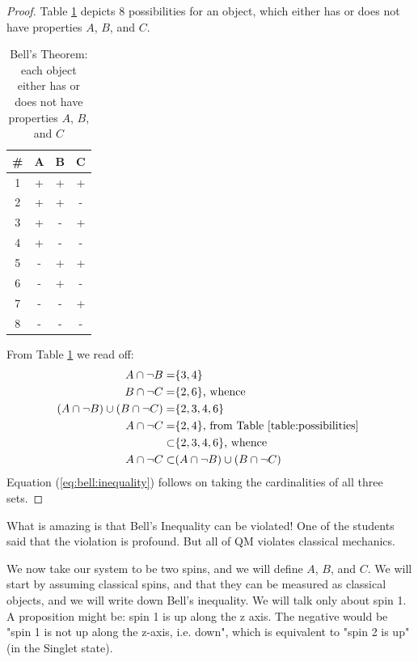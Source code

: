 \documentclass[]{article}
\begin{document}
\begin{proof}

    Table \ref{table:possibilities} depicts 8 possibilities for an object, which either has or does not have properties $A$, $B$, and $C$.
  
	\begin{table}[H]
		\caption{Bell's Theorem: each object either has or does not have properties $A$, $B$, and $C$}\label{table:possibilities}
		\begin{center}
			\begin{tabular}{|c|c|c|c|} \hline
				\#&A&B&C \\ \hline
				1&+&+&+ \\ \hline 
				2&+&+&- \\ \hline
				3&+&-&+ \\ \hline 
				4&+&-&- \\ \hline
				5&-&+&+ \\ \hline 
				6&-&+&- \\ \hline
				7&-&-&+ \\ \hline 
				8&-&-&- \\ \hline
			\end{tabular}
		\end{center}
	\end{table}

	From Table \ref{table:possibilities} we read off:
	\begin{align*}
		A \cap \neg B =& \{3, 4\} \\
		B \cap \neg C =& \{2, 6\} \text{, whence}\\
		(A \cap \neg B) \cup (B \cap \neg C) =&\{2,3,4, 6\}\\
		A \cap \neg C =& \{2,4\} \text{, from Table \ref{table:possibilities} }\\
		\subset& \{2,3,4, 6\} \text{, whence}\\
		A \cap \neg C \subset&(A \cap \neg B) \cup (B \cap \neg C)
	\end{align*}
Equation (\ref{eq:bell:inequality}) follows on taking the cardinalities of all three sets.
\end{proof}
What is amazing is that Bell's Inequality can be violated! One of the students said that the violation is profound. But all of QM violates classical mechanics. 

We now take our system to be two spins, and we will define $A$, $B$, and $C$. We will start by assuming classical spins, and that they can be measured as classical objects, and we will write down Bell's inequality. We will talk only about spin 1. A proposition might be: spin 1 is up along the z axis. The negative would be "spin 1 is not up along the z-axis, i.e. down", which is equivalent to "spin 2 is up" (in the Singlet state).
\end{document}
